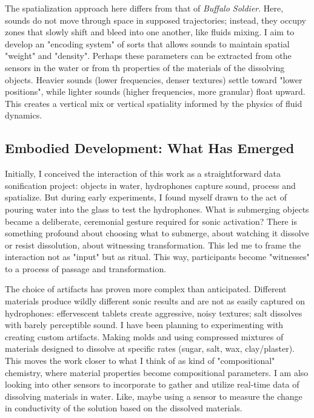 The spatialization approach here differs from that of \emph{Buffalo Soldier}. Here, sounds do not move through space in supposed trajectories; instead, they occupy zones that slowly shift and bleed into one another, like fluids mixing. I aim to develop an "encoding system" of sorts that allows sounds to maintain spatial "weight" and "density". Perhaps these parameters can be extracted from othe sensors in the water or from th properties of the materials of the dissolving objects. Heavier sounds (lower frequencies, denser textures) settle toward "lower positions", while lighter sounds (higher frequencies, more granular) float upward. This creates a vertical mix or vertical spatiality informed by the physics of fluid dynamics.

\subsection{Embodied Development: What Has Emerged}

Initially, I conceived the interaction of this work as a straightforward data sonification project: objects in water, hydrophones capture sound, process and spatialize. But during early experiments, I found myself drawn to the act of pouring water into the glass to test the hydrophones. What is submerging objects became a deliberate, ceremonial gesture required for sonic activation? There is something profound about choosing what to submerge, about watching it dissolve or resist dissolution, about witnessing transformation. This led me to frame the interaction not as "input" but as ritual. This way, participants become "witnesses" to a process of passage and transformation.

The choice of artifacts has proven more complex than anticipated. Different materials produce wildly different sonic results and are not as easily captured on hydrophones: effervescent tablets create aggressive, noisy textures; salt dissolves with barely perceptible sound. I have been planning to experimenting with creating custom artifacts. Making molds and using compressed mixtures of materials designed to dissolve at specific rates (sugar, salt, wax, clay/plaster). This moves the work closer to what I think of as kind of "compositional" chemistry, where material properties become compositional parameters. I am also looking into other sensors to incorporate to gather and utilize real-time data of dissolving materials in water. Like, maybe using a sensor to measure the change in conductivity of the solution based on the dissolved materials.

